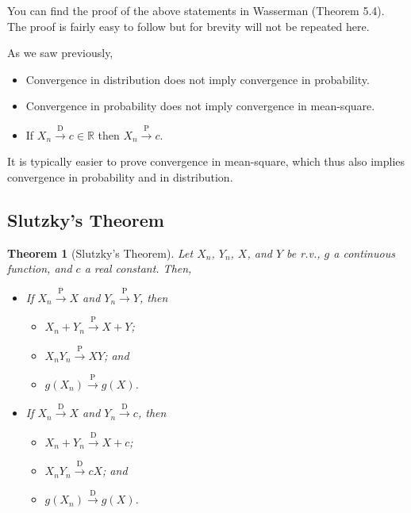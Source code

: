 \documentclass[
]{book}
\providecommand{\tightlist}{%
  \setlength{\itemsep}{0pt}\setlength{\parskip}{0pt}}
\newcommand{\bbR}{\mathbb{R}}
\newtheorem{theorem}{Theorem}[chapter]
\theoremstyle{definition}
\theoremstyle{definition}
\theoremstyle{definition}
\theoremstyle{definition}
\theoremstyle{remark}
\begin{document}
You can find the proof of the above statements in Wasserman (Theorem 5.4). The proof is fairly easy to follow but for brevity will not be repeated here.

As we saw previously,

\begin{itemize}
\tightlist
\item
  Convergence in distribution does not imply convergence in probability.
\item
  Convergence in probability does not imply convergence in mean-square.
\item
  If \(X_n \xrightarrow{\text{D}}c\in\bbR\) then \(X_n \xrightarrow{\text{P}}c\).
\end{itemize}

It is typically easier to prove convergence in mean-square, which thus also implies convergence in probability and in distribution.

\hypertarget{slutzkys-theorem}{%
\subsection{Slutzky's Theorem}\label{slutzkys-theorem}}

\begin{theorem}[Slutzky's Theorem]

Let \(X_n\), \(Y_n\), \(X\), and \(Y\) be r.v., \(g\) a continuous function, and
\(c\) a real constant. Then,

\begin{itemize}
\item
  If \(X_n{\xrightarrow{\text{P}}} X\) and \(Y_n{\xrightarrow{\text{P}}} Y\),
  then

  \begin{itemize}
  \tightlist
  \item
    \(X_n+Y_n{\xrightarrow{\text{P}}} X+Y\);
  \item
    \(X_nY_n{\xrightarrow{\text{P}}} XY\); and
  \item
    \(g(X_n){\xrightarrow{\text{P}}} g(X)\).
  \end{itemize}
\item
  If \(X_n{\xrightarrow{\text{D}}} X\) and \(Y_n{\xrightarrow{\text{D}}} c\), then

  \begin{itemize}
  \tightlist
  \item
    \(X_n+Y_n{\xrightarrow{\text{D}}} X+c\);
  \item
    \(X_nY_n{\xrightarrow{\text{D}}} cX\); and
  \item
    \(g(X_n){\xrightarrow{\text{D}}} g(X)\).
  \end{itemize}
\end{itemize}

\end{theorem}
\end{document}
